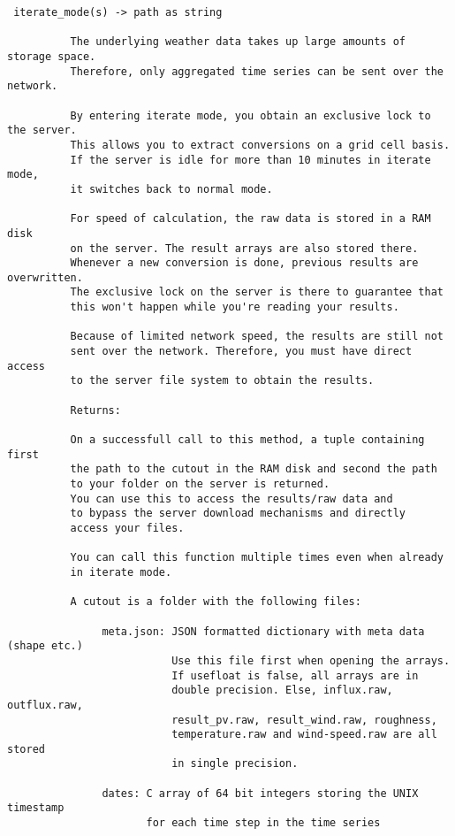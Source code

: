\begin{verbatim}
 iterate_mode(s) -> path as string
          
          The underlying weather data takes up large amounts of storage space.
          Therefore, only aggregated time series can be sent over the network.

          By entering iterate mode, you obtain an exclusive lock to the server.
          This allows you to extract conversions on a grid cell basis.
          If the server is idle for more than 10 minutes in iterate mode,
          it switches back to normal mode.
          
          For speed of calculation, the raw data is stored in a RAM disk
          on the server. The result arrays are also stored there.
          Whenever a new conversion is done, previous results are overwritten.
          The exclusive lock on the server is there to guarantee that
          this won't happen while you're reading your results.

          Because of limited network speed, the results are still not
          sent over the network. Therefore, you must have direct access
          to the server file system to obtain the results.

          Returns:

          On a successfull call to this method, a tuple containing first
          the path to the cutout in the RAM disk and second the path
          to your folder on the server is returned.
          You can use this to access the results/raw data and 
          to bypass the server download mechanisms and directly
          access your files.

          You can call this function multiple times even when already
          in iterate mode.
     
          A cutout is a folder with the following files:
          
               meta.json: JSON formatted dictionary with meta data (shape etc.)
                          Use this file first when opening the arrays.
                          If usefloat is false, all arrays are in
                          double precision. Else, influx.raw, outflux.raw,
                          result_pv.raw, result_wind.raw, roughness,
                          temperature.raw and wind-speed.raw are all stored
                          in single precision.
               
               dates: C array of 64 bit integers storing the UNIX timestamp
                      for each time step in the time series


\end{verbatim}
